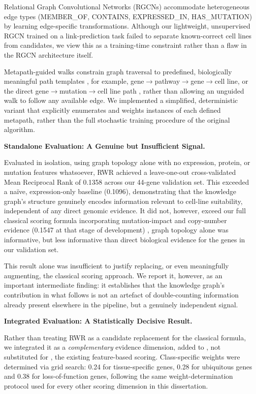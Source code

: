 \documentclass[author={Karen Coutinho, Ishaan Bhalla, Aman Raj, Dixit Kaloorani Malarmannan},
                supervisor={Dr. Daniel D'Andrea},
                degree={MSc},
                title={CellSelector Omics: A Multi-Omics Recommendation System for Cell Line Selection},
                subtitle={},
                type={},
                year={2026}]{dissertation}
\begin{document}
Relational Graph Convolutional Networks (RGCNs) accommodate heterogeneous edge types (MEMBER\_OF, CONTAINS, EXPRESSED\_IN, HAS\_MUTATION) by learning edge-specific transformations. Although our lightweight, unsupervised RGCN trained on a link-prediction task failed to separate known-correct cell lines from candidates, we view this as a training-time constraint rather than a flaw in the RGCN architecture itself.

Metapath-guided walks constrain graph traversal to predefined, biologically meaningful path templates , for example, gene$\to$pathway$\to$gene$\to$cell line, or the direct gene$\to$mutation$\to$cell line path , rather than allowing an unguided walk to follow any available edge. We implemented a simplified, deterministic variant that explicitly enumerates and weights instances of each defined metapath, rather than the full stochastic training procedure of the original algorithm.

{\bf Standalone Evaluation: A Genuine but Insufficient Signal.}

Evaluated in isolation, using graph topology alone with no expression, protein, or mutation features whatsoever, RWR achieved a leave-one-out cross-validated Mean Reciprocal Rank of 0.1358 across our 44-gene validation set. This exceeded a na\"{i}ve, expression-only baseline (0.1096), demonstrating that the knowledge graph's structure genuinely encodes information relevant to cell-line suitability, independent of any direct genomic evidence. It did not, however, exceed our full classical scoring formula incorporating mutation-impact and copy-number evidence (0.1547 at that stage of development) , graph topology alone was informative, but less informative than direct biological evidence for the genes in our validation set.

This result alone was insufficient to justify replacing, or even meaningfully augmenting, the classical scoring approach. We report it, however, as an important intermediate finding: it establishes that the knowledge graph's contribution in what follows is not an artefact of double-counting information already present elsewhere in the pipeline, but a genuinely independent signal.

{\bf Integrated Evaluation: A Statistically Decisive Result.}

Rather than treating RWR as a candidate replacement for the classical formula, we integrated it as a \textit{complementary} evidence dimension, added to , not substituted for , the existing feature-based scoring. Class-specific weights were determined via grid search: 0.24 for tissue-specific genes, 0.28 for ubiquitous genes and 0.38 for loss-of-function genes, following the same weight-determination protocol used for every other scoring dimension in this dissertation.
\end{document}
